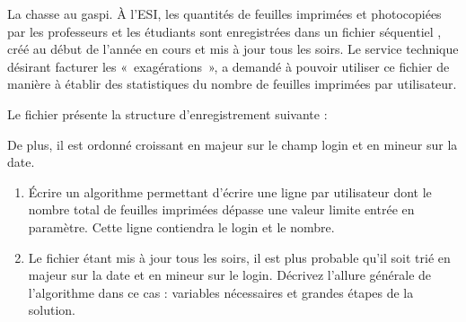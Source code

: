\begin{Exercice}{La chasse au gaspi.}
	À l’ESI, les quantités de feuilles imprimées et photocopiées par les
	professeurs et les étudiants sont enregistrées dans un fichier
	séquentiel , créé au début de l’année en cours et mis à jour
	tous les soirs. Le service technique désirant facturer les
	«~exagérations~», a demandé à pouvoir utiliser ce fichier de manière à
	établir des statistiques du nombre de feuilles imprimées par
	utilisateur.

	Le fichier  présente la structure d’enregistrement
	 suivante :
	

	De plus, il est ordonné croissant en majeur sur le champ login et en
	mineur sur la date. 

	\begin{enumerate}[label=\alph*)]
		\item 
			Écrire un algorithme permettant d'écrire une ligne par
			utilisateur dont le nombre total de feuilles imprimées dépasse une
			valeur limite entrée en paramètre. Cette ligne contiendra le login et
			le nombre.
		\item 
			Le fichier étant mis à jour tous les soirs, il est plus probable
			qu'il soit trié en majeur sur la date et en mineur sur
			le login. Décrivez l'allure générale de
			l'algorithme dans ce cas : variables nécessaires et
			grandes étapes de la solution.
	\end{enumerate}
\end{Exercice}
	
